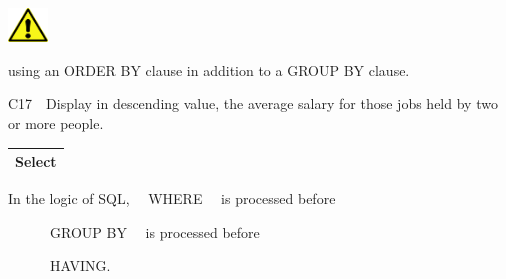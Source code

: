 \begin{center}
  
\includegraphics[width=1.06cm,height=0.903cm]{images/img (2).png}

\end{center}
 using an ORDER BY clause in addition to a GROUP BY clause.

C17\ \ Display in descending value, the average salary for those jobs held by two or more people.

\begin{flushleft}
\tablefirsthead{}
\tablehead{}
\tabletail{}
\tablelasttail{}
\begin{supertabular}{|m{14.583cm}|}
\hline
Select

\\\hline
\end{supertabular}
\end{flushleft}
In the logic of SQL, \ \ WHERE \ \ is processed before

\ \ \ \ \ \ GROUP BY \ \ is processed before

\ \ \ \ \ \ HAVING.
